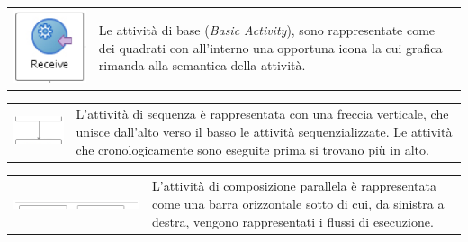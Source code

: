 \begin{tabular}{cp{}}
\includegraphics[scale=0.80]{blide/dia/BlideInv} &
\parbox[b][2.5cm][t]{0.6 \textwidth}{Le attività di base (\emph{Basic
Activity}), sono rappresentate come dei quadrati con all'interno una opportuna
icona la cui grafica rimanda alla semantica della attività.}
\end{tabular}

\begin{tabular}{cp{}}
\includegraphics[scale=0.95]{blide/dia/BlideSec} &
\parbox[b][1.7cm][t]{0.6 \textwidth}{L'attività di sequenza è rappresentata con
una freccia verticale, che unisce dall'alto verso il basso le attività
sequenzializzate. Le attività che cronologicamente sono eseguite prima si
trovano più in alto.}
\end{tabular}

\vspace{0.5cm}

\begin{tabular}{cp{}}
\parbox[b][1.2cm][t]{0.17 \textwidth}{
\includegraphics[scale=0.40]{blide/dia/BlideFlow}} 
&
\parbox[b][1.7cm][t]{0.6 \textwidth}{L'attività di composizione parallela è
rappresentata come una barra orizzontale sotto di cui, da sinistra a destra,
vengono rappresentati i flussi di esecuzione.}
\end{tabular}


